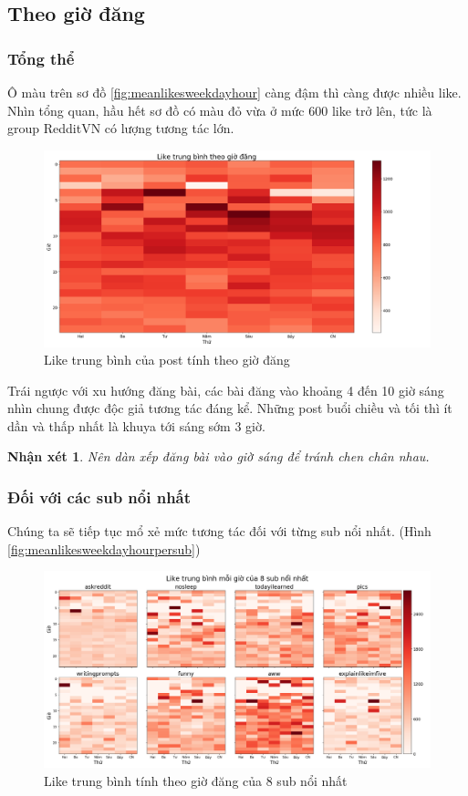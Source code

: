 \documentclass[10pt,a4paper]{article}
\newtheorem{remark}{Nhận xét}
\begin{document}
\subsection{Theo giờ đăng}
\subsubsection{Tổng thể}
Ô màu trên sơ đồ \eqref{fig:meanlikesweekdayhour} càng đậm thì càng được nhiều like. Nhìn tổng quan, hầu hết sơ đồ có màu đỏ vừa ở mức 600 like trở lên, tức là group RedditVN có lượng tương tác lớn.
\begin{figure}[!ht]
    \centering
    \includegraphics[width=\textwidth]{img/MeanLikesWeekdayHour.png}
    \caption{Like trung bình của post tính theo giờ đăng}
    \label{fig:meanlikesweekdayhour}
\end{figure}

Trái ngược với xu hướng đăng bài, các bài đăng vào khoảng 4 đến 10 giờ sáng nhìn chung được độc giả tương tác đáng kể. Những post buổi chiều và tối thì ít dần và thấp nhất là khuya tới sáng sớm 3 giờ.

\begin{remark}
    \label{re:time}
    Nên dàn xếp đăng bài vào giờ sáng để tránh chen chân nhau.
\end{remark}
\subsubsection{Đối với các sub nổi nhất}
Chúng ta sẽ tiếp tục mổ xẻ mức tương tác đối với từng sub nổi nhất. (Hình \eqref{fig:meanlikesweekdayhourpersub})
\begin{figure}[!h]
    \centering
    \includegraphics[width=\textwidth]{img/MeanLikesWeekdayHourPerSub.png}
    \caption{Like trung bình tính theo giờ đăng của 8 sub nổi nhất}
    \label{fig:meanlikesweekdayhourpersub}
\end{figure}
\end{document}
